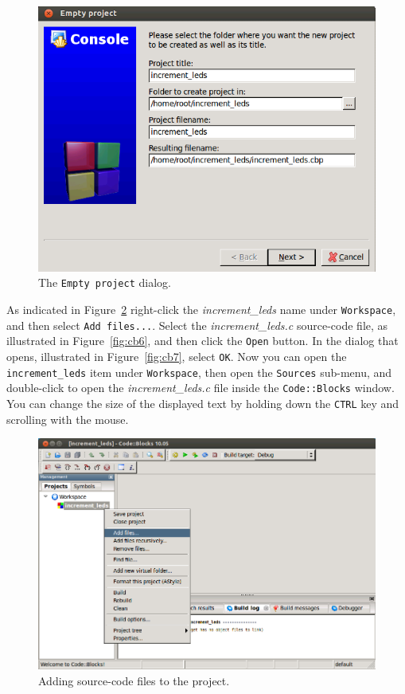 \documentclass[11pt, twoside, pdftex]{article}
\begin{document}
\begin{figure} [h]
\begin{center}
\includegraphics[scale = .60]{figures/cb3.png}
\end{center}
\caption{The \texttt{Empty project} dialog.}
\label{fig:cb3}
\end{figure}

As indicated in Figure~\ref{fig:cb5} right-click the {\it increment\_leds} name under
\texttt{Workspace}, and then select \texttt{Add files...}. Select the {\it
increment\_leds.c} source-code file, as illustrated in Figure~\ref{fig:cb6}, and then 
click the \texttt{Open} button. In the dialog that opens, illustrated in
Figure~\ref{fig:cb7}, select \texttt{OK}. Now you can open the \texttt{increment\_leds} item
under \texttt{Workspace}, then open the \texttt{Sources} sub-menu, and double-click to open 
the {\it increment\_leds.c} file inside the \texttt{Code::Blocks} window. You can change
the size of the displayed text by holding down the \texttt{CTRL} key and scrolling with
the mouse.

\begin{figure} [h]
\begin{center}
\includegraphics[scale = .60]{figures/cb5.png}
\end{center}
\caption{Adding source-code files to the project.}
\label{fig:cb5}
\end{figure}
\end{document}
